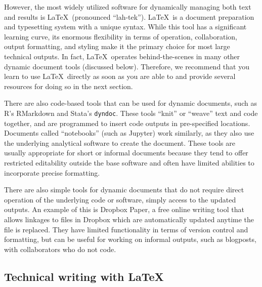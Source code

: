 However, the most widely utilized software
for dynamically managing both text and results is \LaTeX\ (pronounced ``lah-tek'').
\index{\LaTeX}
\LaTeX\ is a document preparation and typesetting system with a unique syntax.
While this tool has a significant learning curve,
its enormous flexibility in terms of operation, collaboration, output formatting, and styling
make it the primary choice for most large technical outputs.
In fact, \LaTeX\ operates behind-the-scenes in many other dynamic document tools (discussed below).
Therefore, we recommend that you learn to use \LaTeX\ directly
as soon as you are able to and provide several resources for doing so in the next section.

There are also code-based tools that can be used for dynamic documents, 
such as R's RMarkdown
and Stata's \texttt{dyndoc}.
These tools ``knit'' or ``weave'' text and code together,
and are programmed to insert code outputs in pre-specified locations.
Documents called ``notebooks'' (such as Jupyter) work similarly,
as they also use the underlying analytical software to create the document.
These tools are usually appropriate for short or informal documents
because they tend to offer restricted editability outside the base software
and often have limited abilities to incorporate precise formatting.

There are also simple tools for dynamic documents
that do not require direct operation of the underlying code or software,
simply access to the updated outputs.
An example of this is Dropbox Paper,
a free online writing tool that allows linkages to files in Dropbox
which are automatically updated anytime the file is replaced.
They have limited functionality in terms of version control and formatting,
but can be useful for working on informal outputs, such as blogposts,
with collaborators who do not code. 


\subsection{Technical writing with \LaTeX}

